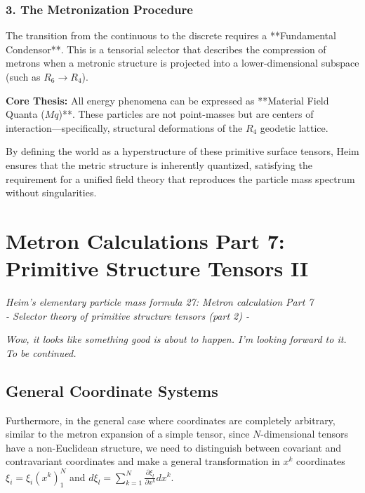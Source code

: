 \documentclass[11pt,a4paper,oneside]{article}
\begin{document}
\subsubsection*{3. The Metronization Procedure}
The transition from the continuous to the discrete requires a **Fundamental Condensor**. This is a tensorial selector that describes the compression of metrons when a metronic structure is projected into a lower-dimensional subspace (such as $R_6 \to R_4$). 
\begin{mbbcite}
    \textbf{Core Thesis:} All energy phenomena can be expressed as **Material Field Quanta ($Mq$)**. These particles are not point-masses but are centers of interaction—specifically, structural deformations of the $R_4$ geodetic lattice.
\end{mbbcite}
By defining the world as a hyperstructure of these primitive surface tensors, Heim ensures that the metric structure is inherently quantized, satisfying the requirement for a unified field theory that reproduces the particle mass spectrum without singularities. 
\section{Metron Calculations Part 7: Primitive Structure Tensors II}
\textit{Heim's elementary particle mass formula 27: Metron calculation Part 7 \\ - Selector theory of primitive structure tensors (part 2) -}

\begin{center}
    \textit{Wow, it looks like something good is about to happen. I'm looking forward to it. To be continued.}
\end{center}

\subsection{General Coordinate Systems}
Furthermore, in the general case where coordinates are completely arbitrary, similar to the metron expansion of a simple tensor, since $N$-dimensional tensors have a non-Euclidean structure, we need to distinguish between covariant and contravariant coordinates and make a general transformation in $x^k$ coordinates $\xi_i = \xi_i(x^k)^N_1$ and $d \xi_l = \sum_{k = 1}^N \frac { \partial \xi_l}{\partial x^k} dx^k$.
\end{document}
